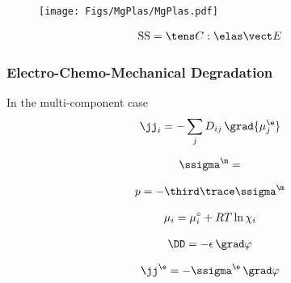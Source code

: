 \begin{figure}[h!]
  \centering
  \texttt{[image: Figs/MgPlas/MgPlas.pdf]}
  \caption{}
  \label{fig:MgPlas}
\end{figure}

\begin{align}
  \SS = \CCCC:\EEe
\end{align}

\subsubsection{Electro-Chemo-Mechanical Degradation}




In the multi-component case 
\begin{align}
  \jj_i = -\sum_j D_{ij} \, \grad{\mu_j^\e}
\end{align}

\begin{align}
  \ssigma^\m = 
\end{align}

\begin{align}
  p = -\third\trace\ssigma^\m
\end{align}

\begin{align}
  \mu_i = \mu_{i}^{\circ} + RT \ln{\chi_i}
\end{align}

\begin{align}
  \DD = -\epsilon \, \grad \varphi
\end{align}

\begin{align}
  \jj^\e = -\ssigma^\e \, \grad \varphi
\end{align}
